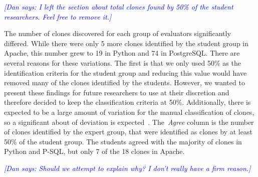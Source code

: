 \documentclass{sig-alternate}
\newcommand{\dan}[1]{\textcolor{blue}{{\it [Dan says: #1]}}}
\begin{document}
\dan{I left the section about total clones found by 50\% of the student researchers. Feel free to remove it.}

The number of clones discovered for each group of evaluators significantly differed. While there were only 5 more clones identified by the student group in Apache, this number grew to 19 in Python and 74 in PostgreSQL. There are several reasons for these variations. The first is that we only used 50\% as the identification criteria for the student group and reducing this value would have removed many of the clones identified by the students. However, we wanted to present these findings for future researchers to use at their discretion and therefore decided to keep the classification criteria at 50\%. Additionally, there is expected to be a large amount of variation for the manual classification of clones, so a significant about of deviation is expected~\cite{Walenstein:2003:PCT:950792.951349}. The~\emph{Agree} column is the number of clones identified by the expert group, that were identified as clones by at least 50\% of the student group. The students agreed with the majority of clones in Python and P-SQL, but only 7 of the 18 clones in Apache.

\dan{Should we attempt to explain why? I don't really have a firm reason.}
\end{document}
